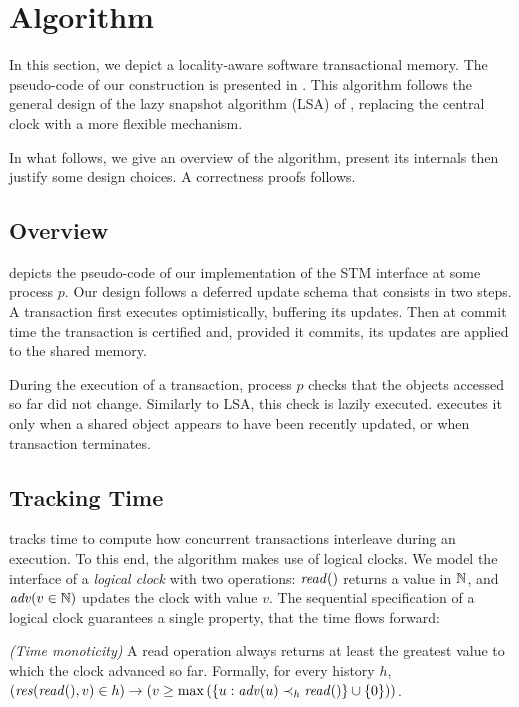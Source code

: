 \section{Algorithm}

In this section, we depict a locality-aware software transactional memory.
The pseudo-code of our construction is presented in .
This algorithm follows the general design of the lazy snapshot algorithm (LSA) of \citet{FelberFMR10}, replacing the central clock with a more flexible mechanism.

In what follows, we give an overview of the algorithm, present its internals then justify some design choices.
A correctness proofs follows.

\subsection{Overview}

 depicts the pseudo-code of our implementation of the STM interface at some process $p$.
Our design follows a deferred update schema that consists in two steps.
A transaction first executes optimistically, buffering its updates.
Then at commit time the transaction is certified and, provided it commits, its updates are applied to the shared memory.

During the execution of a transaction, process $p$ checks that the objects accessed so far did not change.
Similarly to LSA, this check is lazily executed.
 executes it only when a shared object appears to have been recently updated, or when transaction terminates.

\subsection{Tracking Time}


 tracks time to compute how concurrent transactions interleave during an execution.
To this end, the algorithm makes use of logical clocks.
We model the interface of a \emph{logical clock} with two operations: $\cread$ returns a value in $\naturalSet$, and $\cadv(v \in \naturalSet)$ updates the clock with value $v$.
The sequential specification of a logical clock guarantees a single property, that the time flows forward:
\begin{inparaenum}
\item[\emph{(Time monoticity)}]
  A read operation always returns at least the greatest value to which the clock advanced so far.
  Formally, for every history $h$, $(\responseAny{\cread}{v} \in h) \implies (v \geq \max{(\{u : \cadv(u) \hb_h \cread \} \union \{0\})})$.
\end{inparaenum}

